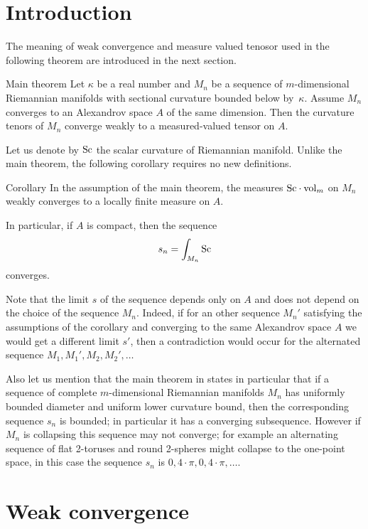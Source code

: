 \section{Introduction}

The meaning of weak convergence and measure valued tenosor used in the following theorem are introduced in the next section.

\begin{thm}{Main theorem}
Let $\kappa$ be a real number and 
$M_n$ be a sequence of $m$-dimensional Riemannian manifolds with sectional curvature bounded below by~$\kappa$.
Assume $M_n$ converges to an Alexandrov space $A$ of the same dimension.
Then the curvature tenors of $M_n$ converge weakly to a measured-valued tensor on $A$.
\end{thm}

Let us denote by $\operatorname{Sc}$ the scalar curvature of Riemannian manifold.
Unlike the main theorem, the following corollary requires no new definitions.


\begin{thm}{Corollary}
In the assumption of the main theorem,
the measures $\Sc\cdot\vol_m$ on $M_n$ weakly converges to a locally finite measure on $A$.

In particular, if $A$ is compact, then the sequence
\[s_n=\int_{M_n}\operatorname{Sc}\]
converges.
\end{thm}

Note that the limit $s$ of the sequence depends only on $A$ and does not depend on the choice of the sequence $M_n$.
Indeed, if for an other sequence $M_n'$ satisfying the assumptions of the corollary and converging to the same Alexandrov space $A$ we would get a different limit $s'$, 
then a contradiction would occur for the alternated sequence $M_1,M_1',M_2,M_2',\dots$

Also let us mention that the main theorem in \cite{petrunin-SC} states in particular that if a sequence of complete $m$-dimensional Riemannian  manifolds $M_n$ has uniformly bounded diameter and uniform lower curvature bound, then 
the corresponding sequence $s_n$ is bounded; in particular it has a converging subsequence.
However if $M_n$ is collapsing this sequence may not converge; 
for example an alternating sequence of flat 2-toruses and round 2-spheres might collapse to the one-point space, in this case the sequence $s_n$ is $0,4\cdot\pi,0,4\cdot\pi,\dots$.




\section{Weak convergence}

